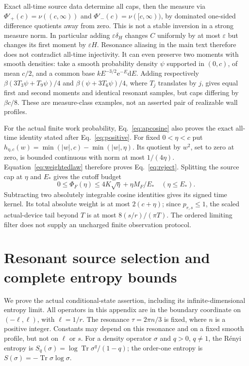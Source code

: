 \documentclass[aps,pra,reprint,superscriptaddress,longbibliography]{revtex4-2}
\newcommand{\Tr}{\operatorname{Tr}}
\newcommand{\dd}{\mathrm d}
\newcommand{\ee}{\mathrm e}
\begin{document}
Exact all-time source data determine all caps, then the measure via
$\Phi'_+(c)=\nu((c,\infty))$ and
$\Phi'_-(c)=\nu([c,\infty))$, by dominated one-sided difference
quotients away from zero. This is not a stable inversion in a strong
measure norm. In particular adding $\varepsilon\delta_H$ changes
$C$ uniformly by at most $\varepsilon$ but changes its first moment
by $\varepsilon H$. Resonance aliasing in the main text therefore
does not contradict all-time injectivity. It can even preserve two
moments with smooth densities: take a smooth probability density
$\psi$ supported in $(0,c)$, of mean $c/2$, and a common base
$kE^{-3/2}\ee^{-E}\dd E$. Adding respectively
$\beta(3T_3\psi+T_9\psi)/4$ and
$\beta(\psi+3T_6\psi)/4$, where $T_j$ translates by $j$, gives
equal first and second moments and identical resonant samples, but
caps differing by $\beta c/8$. These are measure-class examples,
not an asserted pair of realizable wall profiles.

For the actual finite work probability, Eq.~\eqref{eq:apcosine}
also proves the exact all-time identity stated after
Eq.~\eqref{eq:positive}. For fixed $0<\eta<c$ put
$h_{\eta,c}(w)=\min(|w|,c)-\min(|w|,\eta)$.
Its quotient by $w^2$, set to zero at zero, is bounded continuous
with norm at most $1/(4\eta)$. Equation~\eqref{eq:weightedlaw}
therefore proves Eq.~\eqref{eq:reject}. Splitting the source cap at
$\eta$ and $E_*$ gives the cutoff budget
\begin{equation}
 0\le\Phi_F(\eta)\le4K\sqrt\eta+\eta M_F/E_*
                               \quad(\eta\le E_*).        \label{eq:apcutoffbudget}
\end{equation}
Subtracting two absolutely integrable cosine identities gives its
signed time kernel. Its total absolute weight is at most
$2(c+\eta)$; since $p_{r,s}\le1$, the scaled actual-device tail
beyond $T$ is at most $8(s/r)/(\pi T)$. The ordered limiting
filter does not supply an uncharged finite observation protocol.

\section{Resonant source selection and complete entropy bounds}
\label{app:control}

We prove the actual conditional-state assertion, including its
infinite-dimensional entropy limit. All operators in this appendix
are in the boundary coordinate on $(-\ell,\ell)$, with
$\ell=1/r$. The resonance $\tau=2\pi n/3$ is fixed, where $n$ is a
positive integer. Constants may depend on this resonance and on a
fixed smooth profile, but not on $\ell$ or $s$.
For a density operator $\sigma$ and $q>0$, $q\ne1$, the
R\'enyi entropy is $S_q(\sigma)=\log\Tr\sigma^q/(1-q)$;
the order-one entropy is $S(\sigma)=-\Tr\sigma\log\sigma$.
\end{document}
